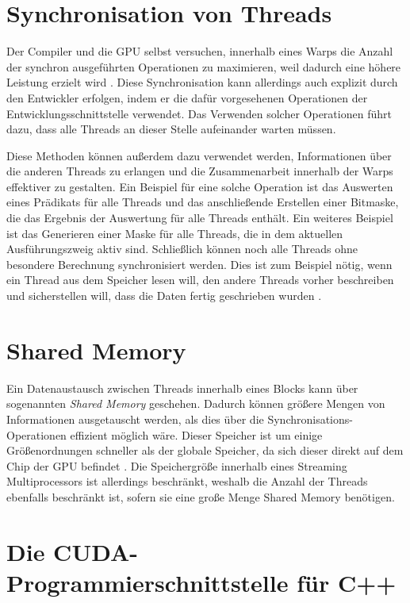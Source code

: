 \section{Synchronisation von Threads}
\label{sec:synchronisation_von_threads}

Der Compiler und die GPU selbst versuchen, innerhalb eines Warps die Anzahl der synchron ausgeführten Operationen zu maximieren, weil dadurch eine höhere Leistung erzielt wird \cite{Nickolls2009}.
Diese Synchronisation kann allerdings auch explizit durch den Entwickler erfolgen, indem er die dafür vorgesehenen Operationen der Entwicklungsschnittstelle verwendet.
Das Verwenden solcher Operationen führt dazu, dass alle Threads an dieser Stelle aufeinander warten müssen.

Diese Methoden können außerdem dazu verwendet werden, Informationen über die anderen Threads zu erlangen und die Zusammenarbeit innerhalb der Warps effektiver zu gestalten.
Ein Beispiel für eine solche Operation ist das Auswerten eines Prädikats für alle Threads und das anschließende Erstellen einer Bitmaske, die das Ergebnis der Auswertung für alle Threads enthält.
Ein weiteres Beispiel ist das Generieren einer Maske für alle Threads, die in dem aktuellen Ausführungszweig aktiv sind.
Schließlich können noch alle Threads ohne besondere Berechnung synchronisiert werden.
Dies ist zum Beispiel nötig, wenn ein Thread aus dem Speicher lesen will, den andere Threads vorher beschreiben und sicherstellen will, dass die Daten fertig geschrieben wurden \cite{Lin2018}.

\section{Shared Memory}

Ein Datenaustausch zwischen Threads innerhalb eines Blocks kann über sogenannten \emph{Shared Memory} geschehen.
Dadurch können größere Mengen von Informationen ausgetauscht werden, als dies über die Synchronisations-Operationen effizient möglich wäre.
Dieser Speicher ist um einige Größenordnungen schneller als der globale Speicher, da sich dieser direkt auf dem Chip der GPU befindet \cite{Harris2013}.
Die Speichergröße innerhalb eines Streaming Multiprocessors ist allerdings beschränkt, weshalb die Anzahl der Threads ebenfalls beschränkt ist, sofern sie eine große Menge Shared Memory benötigen.

\section{Die CUDA-Programmierschnittstelle für C++}

